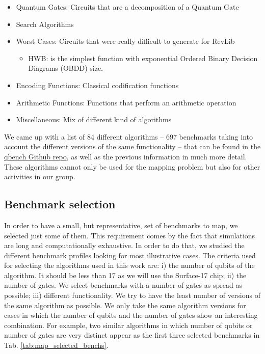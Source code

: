 \begin{itemize}
\item Quantum Gates: Circuits that are a decomposition of a Quantum Gate
\item Search Algorithms
\item Worst Cases: Circuits that were really difficult to generate for RevLib
\begin{itemize}
\item HWB: is the simplest function with exponential Ordered Binary Decision Diagrams (OBDD) size.
\end{itemize}
\item Encoding Functions: Classical codification functions
\item Arithmetic Functions: Functions that perform an arithmetic operation
\item Miscellaneous: Mix of different kind of algorithms
\end{itemize}

We came up with a list of 84 different algorithms -- 697 benchmarks taking into account the different versions of the same functionality -- that can be found in the \href{https://github.com/QE-Lab/qbench}{qbench Github repo}, as well as the previous information in much more detail.
These algorithms cannot only be used for the mapping problem but also for other activities in our group.

\subsection{Benchmark selection}
\label{sec:org80c681f}

In order to have a small, but representative, set of benchmarks to map, we selected just some of them.
This requirement comes by the fact that simulations are long and computationally exhaustive.
In order to do that, we studied the different benchmark profiles looking for most illustrative cases.
The criteria used for selecting the algorithms used in this work are: 
i) the number of qubits of the algorithm. It should be less than 17 as we will use the Surface-17 chip; ii) the number of gates.
We select benchmarks with a number of gates as spread as possible; iii) different functionality.
We try to have the least number of versions of the same algorithm as possible.
We only take the same algorithm versions for cases in which the number of qubits and the number of gates show an interesting combination.
For example, two similar algorithms in which number of qubits or number of gates are very distinct appear as the first three selected benchmarks in Tab. \ref{tab:map_selected_benchs}.

